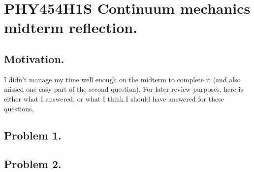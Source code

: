 
%

\chapter{PHY454H1S Continuum mechanics midterm reflection.}
\label{chap:continuumMidtermReflection}
{}
\date{Mar 14, 2012}

\beginArtWithToc

\section{Motivation.}

I didn't manage my time well enough on the midterm to complete it (and also missed one easy part of the second question).  For later review purposes, here is either what I answered, or what I think I should have answered for these questions.

\section{Problem 1.}

\section{Problem 2.}

\EndNoBibArticle
